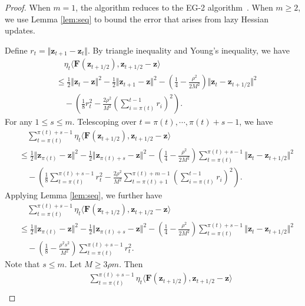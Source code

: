 \documentclass{article}
\def\vz{{\bm{z}}}
\def\mF{{\bm{F}}}
\theoremstyle{plain}
\begin{document}
\begin{proof}

When $m=1$, the algorithm reduces to the EG-2 algorithm~\citep{huang2022approximation,lin2022explicit,adil2022optimal}. When $m \ge 2$, we use Lemma \ref{lem:seq} to bound the error that arises from lazy Hessian updates.

Define $r_t = \Vert \vz_{t+1} - \vz_t \Vert$. 
By triangle inequality and Young's inequality, we have
\begin{align*}
    &\quad \eta_t \langle  \mF(\vz_{t+1/2}), \vz_{t+1/2} - \vz \rangle \\ 
    &\le  \frac{1}{2} \Vert \vz_{t} - \vz \Vert^2 - \frac{1}{2} \Vert \vz_{t+1} - \vz \Vert^2 - \left( \frac{1}{4} - \frac{\rho^2}{2 M^2} \right) \Vert \vz_t - \vz_{t+1/2} \Vert^2 \\
    &\quad  -  \left( \frac{1}{8} r_t^2 - \frac{2\rho^2}{M^2} \left( \sum_{i=\pi(t)}^{t-1} r_i \right)^2 \right).
\end{align*}
For any $1 \le s  \le m$.
Telescoping over $t = \pi(t) ,\cdots, \pi(t) + s - 1$, we have
\begin{align*}
    &\quad \sum_{t= \pi(t)}^{\pi(t)  +s -1} \eta_t \langle  \mF(\vz_{t+1/2}), \vz_{t+1/2} - \vz \rangle \\  
    &\le \frac{1}{2} \Vert \vz_{\pi(t)} - \vz \Vert^2 - \frac{1}{2} \Vert \vz_{\pi(t)+s}  - \vz \Vert^2 -  \left( \frac{1}{4} - \frac{\rho^2}{2 M^2} \right) \sum_{t= \pi(t)}^{\pi(t)  +s -1}  \Vert \vz_t - \vz_{t+1/2} \Vert^2 \\
    &\quad - \left( \frac{1}{8} \sum_{t=\pi(t)}^{\pi(t) + s -1} r_t^2 -  \frac{2 \rho^2}{M^2}  \sum_{t=\pi(t)+1}^{\pi(t) + m -1} \left(\sum_{i=\pi(t)}^{t-1} r_i \right)^2 \right).
\end{align*}
Applying Lemma \ref{lem:seq}, we further have
\begin{align*}
    &\quad \sum_{t= \pi(t)}^{\pi(t)  +s -1} \eta_t \langle  \mF(\vz_{t+1/2}), \vz_{t+1/2} - \vz \rangle \\   
    &\le \frac{1}{2} \Vert \vz_{\pi(t)} - \vz \Vert^2 - \frac{1}{2} \Vert \vz_{\pi(t)+s}  - \vz \Vert^2 -  \left( \frac{1}{4} - \frac{\rho^2}{2 M^2} \right) \sum_{t= \pi(t)}^{\pi(t)  +s -1}  \Vert \vz_t - \vz_{t+1/2} \Vert^2 \\
    &\quad - \left( \frac{1}{8} - \frac{\rho^2 s^2}{M^2}  \right) \sum_{t=\pi(t)}^{\pi(t) + s -1} r_t^2.
\end{align*}
Note that $s \le m $. Let $M \ge 3 \rho m$. Then
\begin{align*}
    &\quad \sum_{t= \pi(t)}^{\pi(t)  +s -1} \eta_t \langle  \mF(\vz_{t+1/2}), \vz_{t+1/2} - \vz \rangle \\

\end{align*}
\end{proof}
\end{document}
